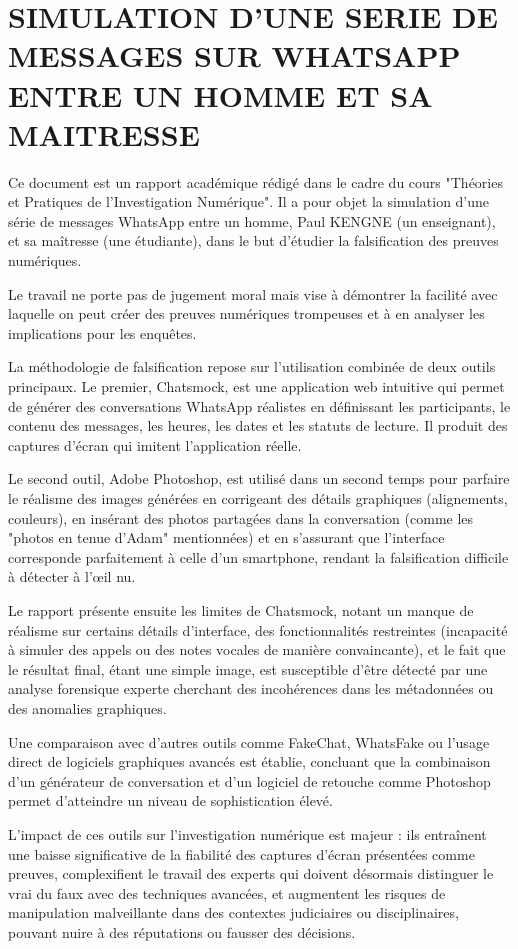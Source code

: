 \documentclass[12pt,a4paper]{article}
\begin{document}
\section{SIMULATION D'UNE SERIE DE MESSAGES SUR WHATSAPP ENTRE UN HOMME ET SA MAITRESSE}

Ce document est un rapport académique rédigé dans le cadre du cours "Théories et Pratiques de l'Investigation Numérique". Il a pour objet la simulation d'une série de messages WhatsApp entre un homme, Paul KENGNE (un enseignant), et sa maîtresse (une étudiante), dans le but d'étudier la falsification des preuves numériques. 

Le travail ne porte pas de jugement moral mais vise à démontrer la facilité avec laquelle on peut créer des preuves numériques trompeuses et à en analyser les implications pour les enquêtes. 

La méthodologie de falsification repose sur l'utilisation combinée de deux outils principaux. Le premier, Chatsmock, est une application web intuitive qui permet de générer des conversations WhatsApp réalistes en définissant les participants, le contenu des messages, les heures, les dates et les statuts de lecture. Il produit des captures d'écran qui imitent l'application réelle. 

Le second outil, Adobe Photoshop, est utilisé dans un second temps pour parfaire le réalisme des images générées en corrigeant des détails graphiques (alignements, couleurs), en insérant des photos partagées dans la conversation (comme les "photos en tenue d'Adam" mentionnées) et en s'assurant que l'interface corresponde parfaitement à celle d'un smartphone, rendant la falsification difficile à détecter à l'œil nu. 

Le rapport présente ensuite les limites de Chatsmock, notant un manque de réalisme sur certains détails d'interface, des fonctionnalités restreintes (incapacité à simuler des appels ou des notes vocales de manière convaincante), et le fait que le résultat final, étant une simple image, est susceptible d'être détecté par une analyse forensique experte cherchant des incohérences dans les métadonnées ou des anomalies graphiques. 

Une comparaison avec d'autres outils comme FakeChat, WhatsFake ou l'usage direct de logiciels graphiques avancés est établie, concluant que la combinaison d'un générateur de conversation et d'un logiciel de retouche comme Photoshop permet d'atteindre un niveau de sophistication élevé. 

L'impact de ces outils sur l'investigation numérique est majeur : ils entraînent une baisse significative de la fiabilité des captures d'écran présentées comme preuves, complexifient le travail des experts qui doivent désormais distinguer le vrai du faux avec des techniques avancées, et augmentent les risques de manipulation malveillante dans des contextes judiciaires ou disciplinaires, pouvant nuire à des réputations ou fausser des décisions. 
\end{document}
